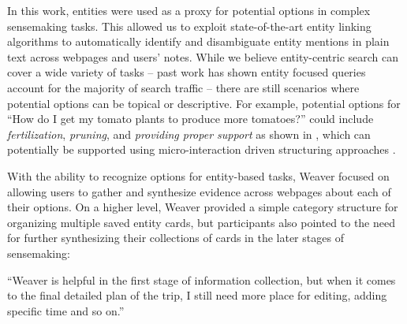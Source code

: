 In this work, entities were used as a proxy for potential options in complex sensemaking tasks. This allowed us to exploit state-of-the-art entity linking algorithms to automatically identify and disambiguate entity mentions in plain text across webpages and users' notes. While we believe entity-centric search can cover a wide variety of tasks -- past work has shown entity focused queries account for the majority of search traffic \cite{guo2009named,lin2012active} -- there are still scenarios where potential options can be topical or descriptive. For example, potential options for ``How do I get my tomato plants to produce more tomatoes?'' could include \emph{fertilization}, \emph{pruning}, and \emph{providing proper support} as shown in \cite{ka,alloy}, which can potentially be supported using micro-interaction driven structuring approaches \cite{alloy,hu2014interactive}.





With the ability to recognize options for entity-based tasks, Weaver focused on allowing users to gather and synthesize evidence across webpages about each of their options. On a higher level, Weaver provided a simple category structure for organizing multiple saved entity cards, but participants also pointed to the need for further synthesizing their collections of cards in the later stages of sensemaking:

\begin{tightquote}
``Weaver is helpful in the first stage of information collection, but when it comes to the final detailed plan of the trip, I still need more place for editing, adding specific time and so on.''
\end{tightquote}

